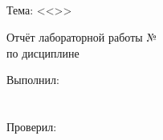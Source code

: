 \begin{ESKDtitlePage}
  \begin{center}
    \envReportMinistr \\
    \envReportEducation \\
    \envReportUniversity \\
    \envReportCathedra \\
  \end{center}

  \vfill

  \begin{center}
    Тема: <<\envReportTitle>>
  \end{center}

  \vfill

  \begin{center}
    Отчёт лабораторной работы №\envReportLabNumber \\
    по дисциплине \envReportSubject \\
  \end{center}

  \vfill

  \begin{flushright}
    \begin{minipage}[t]{7cm}
      Выполнил: \\
      \envReportStudentInfo \\
      \hspace{0pt} \\
      Проверил: \\
      \envReportTeacherInfo \\
    \end{minipage}
  \end{flushright}

  \vfill

  \begin{center}
    \envReportCity~\ESKDtheYear
  \end{center}
\end{ESKDtitlePage}
